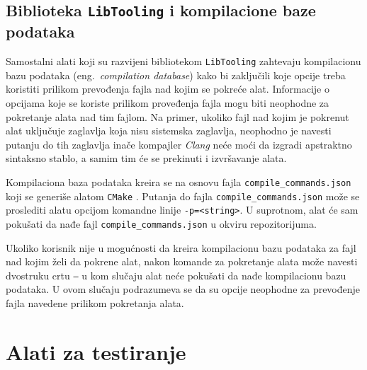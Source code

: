 \documentclass[12pt,oneside]{memoir}
\begin{document}
\subsection{Biblioteka \texttt{LibTooling} i kompilacione baze podataka}
Samostalni alati koji su razvijeni bibliotekom \texttt{Lib\-Tooling} zahtevaju kompilacionu bazu podataka (eng.~\textit{compilation database}) kako bi zaklju\v{c}ili koje opcije treba koristiti prilikom prevođenja fajla nad kojim se pokre\'{c}e alat. Informacije o opcijama koje se koriste prilikom proveđenja fajla mogu biti neophodne za pokretanje alata nad tim fajlom. Na primer, ukoliko fajl nad kojim je pokrenut alat uklju\v{c}uje zaglavlja koja nisu sistemska zaglavlja, neophodno je navesti putanju do tih zaglavlja ina\v{c}e kompajler \textit{Clang} ne\'{c}e mo\'{c}i da izgradi apstraktno sintaksno stablo, a samim tim \'{c}e se prekinuti i izvr\v{s}avanje alata.
\par
Kompilaciona baza podataka kreira se na osnovu fajla \texttt{compile\_commands.json} koji se generi\v{s}e alatom \texttt{CMake} \cite{compilationDatabase}.
Putanja do fajla \texttt{compile\_commands.json}  mo\v{z}e se proslediti alatu opcijom komandne linije \texttt{-p=<string>}. U suprotnom, alat \'{c}e sam poku\v{s}ati da nađe fajl \texttt{compile\_commands.json} u okviru repozitorijuma.
\par
Ukoliko korisnik nije u mogu\'{c}nosti da kreira kompilacionu bazu podataka za fajl nad kojim \v{z}eli da pokrene alat, nakon komande za pokretanje alata mo\v{z}e navesti dvostruku crtu \texttt{--} u kom slu\v{c}aju alat ne\'{c}e poku\v{s}ati da nađe kompilacionu bazu podataka. U ovom slu\v{c}aju
podrazumeva se da su opcije neophodne za prevođenje fajla navedene prilikom pokretanja alata. 

\section{Alati za testiranje}
\end{document}
